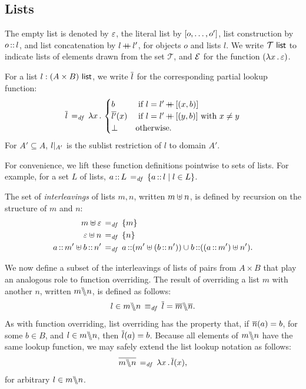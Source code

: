 \documentclass[11pt]{report}         %
\begin{document}
\subsection{Lists}
\label{sec:lists}

The empty list is denoted by $\lnil$, the literal list by $\llit{o,\ldots, o'}$, list construction by $o \lcons l$, and list concatenation by $l \lapp l'$, for objects $o$ and lists $l$. We write $\listof{\mathcal{T}}$ to indicate lists of elements drawn from the set $\mathcal{T}$, and $\arnil$ for the function $(\fun{x} \lnil)$. 

For a list $l : \listof{(A \times B)}$, we write $\funof{l}$ for the corresponding partial lookup function: \[ \funof{l} \eqdef \fun{x} \begin{cases}
  b &\text{ if $l = l' \lapp \llit{(x,b)}$}\\
  \funof{l'}(x) &\text{ if $l = l' \lapp \llit{(y,b)}$ with $x \neq y$}\\
  \bot & \text{otherwise.}
\end{cases}\] For $A' \subseteq A$, $\restrict{l}{A'}$ is the sublist restriction of $l$ to domain $A'$.

For convenience, we lift these function definitions pointwise to sets of lists. For example, for a set $L$ of lists, $a \lcons L \eqdef \setof{a \lcons l}{l \in L}$. 

The set of \emph{interleavings} of lists $m,n$, written $m \merge n$, is defined by recursion on the structure of $m$ and $n$: \begin{align*}
  m \merge \lnil &\eqdef \set{m} \\
  \lnil \merge n &\eqdef \set{n} \\ 
  a \lcons m' \merge b \lcons n' & \eqdef a \lcons (m' \merge (b\lcons n')) \cup b \lcons ((a \lcons m') \merge n').
\end{align*}

We now define a subset of the interleavings of lists of pairs from $A \times B$ that play an analogous role to function overriding. The result of overriding a list $m$ with another $n$, written $m \override n$, is defined as follows: \[ l \in m \override n \iffdef \funof{l} = \funof{m} \override \funof{n}.\] As with function overriding, list overriding has the property that, if $\funof{n}(a) = b$, for some $b \in B$, and $l \in m \override n$, then $\funof{l}(a) = b$. Because all elements of $m \override n$ have the same lookup function, we may safely extend the list lookup notation as follows: \[ \funof{m \override n} \eqdef \fun{x} \funof{l}(x),\] for arbitrary $l \in m \override n$. 
\end{document}
